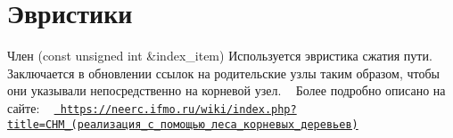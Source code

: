 \chapter{Эвристики}
\hypertarget{req}{}\label{req}

\begin{DoxyRefList}
\item[Член \doxylink{struct_d_s_f_a2acb9ab4bfa885e1ca3010d38655c588}{DSF\texorpdfstring{$<$}{<} type \texorpdfstring{$>$}{>}\+::get\+\_\+private} (const unsigned int \&index\+\_\+item)]\label{req__req000001}%
%
 Используется эвристика сжатия пути. ~\newline
Заключается в обновлении ссылок на родительские узлы таким образом, чтобы они указывали непосредственно на корневой узел. ~\newline
Более подробно описано на сайте\+: ~\newline
\href{https://neerc.ifmo.ru/wiki/index.php?title=\%D0\%A1\%D0\%9D\%D0\%9C_(\%D1\%80\%D0\%B5\%D0\%B0\%D0\%BB\%D0\%B8\%D0\%B7\%D0\%B0\%D1\%86\%D0\%B8\%D1\%8F_\%D1\%81_\%D0\%BF\%D0\%BE\%D0\%BC\%D0\%BE\%D1\%89\%D1\%8C\%D1\%8E_\%D0\%BB\%D0\%B5\%D1\%81\%D0\%B0_\%D0\%BA\%D0\%BE\%D1\%80\%D0\%BD\%D0\%B5\%D0\%B2\%D1\%8B\%D1\%85_\%D0\%B4\%D0\%B5\%D1\%80\%D0\%B5\%D0\%B2\%D1\%8C\%D0\%B5\%D0\%B2)}{\texttt{ https\+://neerc.\+ifmo.\+ru/wiki/index.\+php?title=СНМ\+\_\+(реализация\+\_\+с\+\_\+помощью\+\_\+леса\+\_\+корневых\+\_\+деревьев)}}
\end{DoxyRefList}